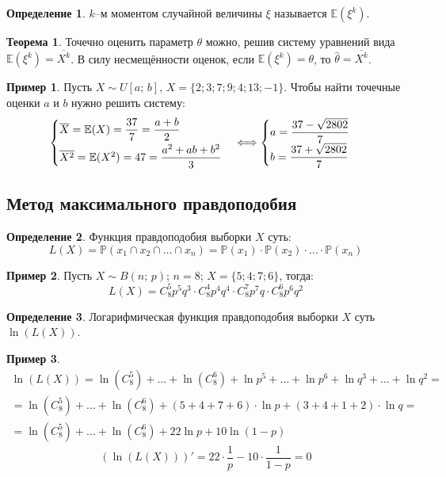 \documentclass[12pt]{article}
\theoremstyle{definition}
\newtheorem{theorem}{Теорема}[section]
\newtheorem*{example}{Пример}
\newtheorem{definition}{Определение}
\newcommand{\E}{\mathbb{E}}
\newcommand{\prob}{\mathbb{P}}
\begin{document}
\begin{definition}
    $k$–м моментом случайной величины $\xi$ называется $\E(\xi^k)$.
\end{definition}
\begin{theorem}
    Точечно оценить параметр $\theta$ можно, решив систему уравнений вида $\E(\xi^k)=\overline{X^k}$. В силу несмещённости оценок, если $\E(\xi^k)=\theta$, то $\hat\theta=\overline{X^k}$.
\end{theorem}
\begin{example}
    Пусть $X\sim U[a;\,b],\,X=\{2;3;7;9;4;13;-1\}$. Чтобы найти точечные оценки $a$ и $b$ нужно решить систему:
    $$\begin{cases}
        \overline{X}=\E(X)=\dfrac{37}{7}=\dfrac{a+b}{2}\\[2\jot]
        \overline{X^2}=\E(X^2)=47=\dfrac{a^2+ab+b^2}{3}
    \end{cases}\Longleftrightarrow\begin{cases}
        a=\dfrac{37-\sqrt{2802}}{7}\\
        b=\dfrac{37+\sqrt{2802}}{7}
    \end{cases}$$
\end{example}

\subsection{Метод максимального правдоподобия}

\begin{definition}
    Функция правдоподобия выборки $X$ суть:
    $$L(X)=\prob(x_1\cap x_2\cap\ldots\cap x_n)=\prob(x_1)\cdot\prob(x_2)\cdot\ldots\cdot\prob(x_n)$$
\end{definition}
\begin{example}
    Пусть $X\sim B(n;\,p);\,n=8;\,X=\{5;4;7;6\}$, тогда:
    $$L(X)=C_8^5p^5q^3\cdot C_8^4p^4q^4\cdot C_8^7p^7q\cdot C_8^6p^6q^2$$
\end{example}
\begin{definition}
    Логарифмическая функция правдоподобия выборки $X$ суть $\ln(L(X))$.
\end{definition}
\begin{example}
    \begin{multline*}
        \ln(L(X))=\ln(C_8^5)+\ldots+\ln(C_8^6)+\ln p^5+\ldots+\ln p^6+\ln q^3+\ldots+\ln q^2=\\
        =\ln(C_8^5)+\ldots+\ln(C_8^6)+(5+4+7+6)\cdot\ln p+(3+4+1+2)\cdot\ln q=\\
        =\ln(C_8^5)+\ldots+\ln(C_8^6)+22\ln p+10\ln(1-p)
    \end{multline*}
    $$\left(\ln(L(X))\right)'=22\cdot\dfrac{1}{p}-10\cdot\dfrac{1}{1-p}=0$$
\end{example}
\end{document}
